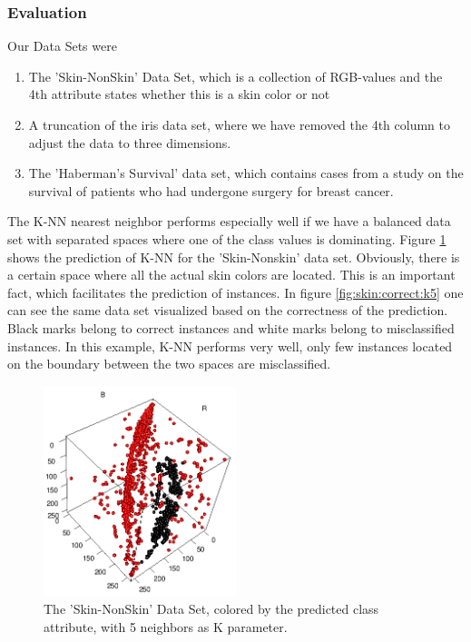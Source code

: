 \documentclass[paper=a4, fontsize=11pt]{scrartcl} %
\numberwithin{equation}{section} %
\numberwithin{figure}{section} %
\numberwithin{table}{section} %
\begin{document}
\subsubsection{Evaluation}
Our Data Sets were 
\begin{enumerate}
\item
    The 'Skin-NonSkin' Data Set, which is a collection of RGB-values and the 4th attribute states whether this is a skin color or not
\item
    A truncation of the iris data set, where we have removed the 4th column to adjust the data to three dimensions.
\item
    The 'Haberman's Survival' data set, which contains cases from a study on the survival of patients who had undergone surgery for breast cancer.
\end{enumerate}

The K-NN nearest neighbor performs especially well if we have a balanced data set with separated spaces where one of the class values is dominating. Figure \ref{fig:skin:predicted:k5} shows the prediction of K-NN for the 'Skin-Nonskin' data set. Obviously, there is a certain space where all the actual skin colors are located. This is an important fact, which facilitates the prediction of instances. In figure \ref{fig:skin:correct:k5} one can see the same data set visualized based on the correctness of the prediction. Black marks belong to correct instances and white marks belong to misclassified instances. In this example, K-NN performs very well, only few instances located on the boundary between the two spaces are misclassified.

\begin{figure}[0.5\textwidth]
    \begin{center}
        \includegraphics[width=0.5\textwidth]{Skin_predicted_k5}
    \end{center}
    \caption['Skin-NonSkin' prediction with k=5]{The 'Skin-NonSkin' Data Set, colored by the predicted class attribute, with 5 neighbors as K parameter.}
    \label{fig:skin:predicted:k5}
\end{figure}
\end{document}
